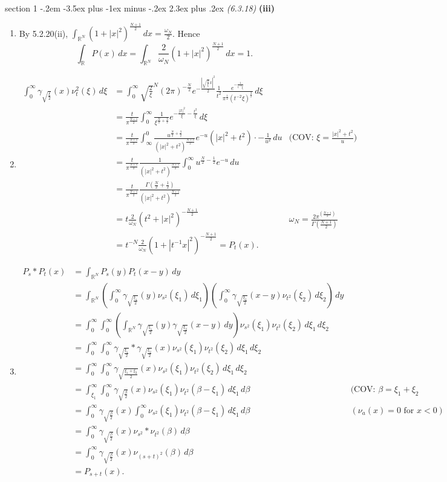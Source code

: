 \documentclass[12pt]{article}
\makeatletter
\theoremstyle{norm}
\newcommand{\R}[0]{\mathbb{R}}
\newcommand{\rc}[1]{\frac{1}{#1}}
\newcommand{\be}[0]{\beta}
\newcommand{\ga}[0]{\gamma}
\newcommand{\Ga}[0]{\Gamma}
\newcommand{\om}[0]{\omega}
\newcommand{\ab}[1]{\left| {#1} \right|}
\newcommand{\pa}[1]{\left( {#1} \right)}
\newcommand{\subprob}[1]{\noindent\textbf{#1}\\}
\newcommand{\pf}[2]{\pa{\frac{#1}{#2}}}
\newcommand{\iy}[0]{\infty}
\newcommand{\sr}[2]{\sqrt{\frac{#1}{#2}}}
\newenvironment{problem}{\@startsection
       {section}
       {1}
       {-.2em}
       {-3.5ex plus -1ex minus -.2ex}
       {2.3ex plus .2ex}
       {\pagebreak[3]%
       \large\bf\noindent{Problem }
       }
       }
       {%
       }
\makeatother
\begin{document}
\begin{problem}{\it (6.3.18)}
\subprob{(iii)}
\begin{enumerate}
\item By 5.2.20(ii), $\int_{\R^N}(1+|x|^2)^{\frac{N+1}{2}}\,dx=\frac{\om_N}{2}$. Hence 
\[
\int_{\R}P(x)\,dx=\int_{\R^N}\frac{2}{\om_N}(1+|x|^2)^{\frac{N+1}{2}}\,dx=1.
\]
\item 
\begin{align*}
\int_0^{\iy} \ga_{\sqrt{\frac{\xi}{2}}}(x)\nu_t^2(\xi)\,d\xi
&=\int_0^{\iy} \sqrt{\frac{2}{\xi}}^N(2\pi)^{-\frac N2}e^{-\frac{\ab{\sqrt{\frac{2}{\xi}}x}^2}{2}}\rc{t^2}\frac{e^{-\rc{t^{-2}\xi}}}{\pi^{\rc2}(t^{-2}\xi)^{\frac32}}\,d\xi\\%
&=\frac{t}{\pi^{\frac{N+1}{2}}}\int_0^{\iy} \rc{\xi^{\frac N2+\frac 32}}e^{-\frac{|x|^2}{\xi}-\frac{t^2}{\xi}}\,d\xi\\%
&=\frac{t}{\pi^{\frac{N+1}{2}}}\int_{\iy}^{0}\frac{u^{\frac N2+\frac32}}{(|x|^2+t^2)^{\frac{N+3}{2}}}e^{-u}(|x|^2+t^2)\cdot-\rc{u^2}\,du&\text{(COV: }\xi=\frac{|x|^2+t^2}{u})\\%
&=\frac{t}{\pi^{\frac{N+1}{2}}}\rc{(|x|^2+t^2)^{\frac{N+1}{2}}}\int_0^{\iy} u^{\frac{N}{2}-\rc2}e^{-u} \,du \\
&=\frac{t}{{\pi^{\frac{N+1}{2}}}}\frac{{\Ga\pa{\frac N2+\rc2}}}{(|x|^2+t^2)^{\frac{N+1}{2}}}\\
&=t\frac{2}{\om_N}(t^2+|x|^2)^{-\frac{N+1}{2}}
&\omega_N=\frac{2\pi^{\pf{N+1}2}}{\Ga\pf{N+1}{2}}\\
&=t^{-N} \frac{2}{\om_N} (1+|t^{-1}x|^2)^{-\frac{N+1}{2}}=P_t(x).
\end{align*}
\item
\begin{align*}
P_s*P_t(x)&=\int_{\R^N}P_s(y)P_t(x-y)\,dy\\
&=\int_{\R^N} \pa{\int_0^{\iy} \ga_{\sqrt{\frac{\xi_1}{2}}}(y)\nu_{s^2}(\xi_1)\,d\xi_1}\pa{\int_0^{\iy}\ga_{\sqrt{\frac{\xi_2}{2}}}(x-y)\nu_{t^2}(\xi_2)\,d\xi_2}\,dy\\
&=\int_0^{\iy}\int_0^{\iy}\pa{\int_{\R^N} \ga_{\sr{\xi_1}{2}}(y)\ga_{\sr{\xi_2}{2}}(x-y)\,dy}\nu_{s^2}(\xi_1)\nu_{t^2}(\xi_2)\,d\xi_1\,d\xi_2\\
&=\int_0^{\iy}\int_0^{\iy} \ga_{\sr{\xi_1}2}*\ga_{\sr{\xi_2}{2}}(x)\nu_{s^2}(\xi_1)\nu_{t^2}(\xi_2)\,d\xi_1\,d\xi_2\\
&=\int_0^{\iy}\int_0^{\iy} \ga_{\sr{\xi_1+\xi_2}{2}}(x)\nu_{s^2}(\xi_1)\nu_{t^2}(\xi_2)\,d\xi_1\,d\xi_2\\
&=\int_{\xi_1}^{\iy}\int_0^{\iy} \ga_{\sr{\be}2}(x)\nu_{s^2}(\xi_1)\nu_{t^2}(\be-\xi_1)\,d\xi_1\,d\be&\text{(COV: }\be=\xi_1+\xi_2\\
&=\int_0^{\iy} \ga_{\sr{\be}2}(x)\int_{0}^{\iy}\nu_{s^2}(\xi_1)\nu_{t^2}(\be-\xi_1)\,d\xi_1\,d\be&(\nu_a(x)=0\text{ for }x<0)\\
&=\int_0^{\iy}\ga_{\sr{\be}{2}}(x)\nu_{s^2}*\nu_{t^2}(\be)\,d\be\\
&=\int_0^{\iy}\ga_{\sr{\be}{2}}(x)\nu_{(s+t)^2}(\be)\,d\be\\
&=P_{s+t}(x).
\end{align*}
\end{enumerate}


\end{problem}
\end{document}
